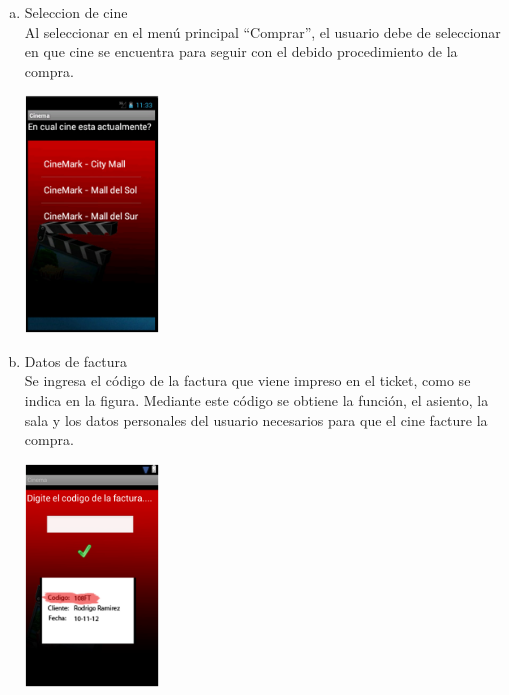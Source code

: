\documentclass[20pt]{article}
\begin{document}
\begin{enumerate}[(a)]
	\item Seleccion de cine\\Al seleccionar en el menú principal “Comprar”, el usuario debe de seleccionar en que cine se 	encuentra para seguir con el debido procedimiento de la compra.\\
	
	\begin{center}
		\includegraphics[totalheight=1.8in,width=1.4in]{seleccion_de_cine}
	\end{center}



	\item Datos de factura\\
	Se ingresa el código de la factura que viene impreso en el ticket, como se indica en la figura.
	Mediante este código se obtiene la función, el asiento, la sala y los datos personales del usuario necesarios para 			que el cine facture la compra.\\

\begin{center}
	\includegraphics[totalheight=1.8in,width=1.4in]{datos_de_factura}
\end{center}




\end{enumerate}
\end{document}
